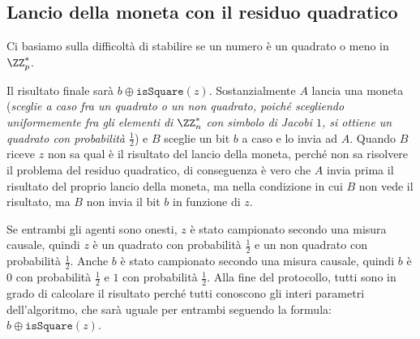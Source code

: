 \subsection{Lancio della moneta con il residuo quadratico}
Ci basiamo sulla difficoltà di stabilire se un numero è un quadrato o meno in $\ZZ_p^*$.

Il risultato finale sarà $b \oplus \texttt{isSquare}(z)$. Sostanzialmente 
$A$ lancia una moneta (\textit{sceglie a caso fra un quadrato o un non quadrato, poiché 
scegliendo uniformemente fra gli elementi di $\ZZ_n^*$ con simbolo 
di Jacobi $1$, si ottiene un quadrato con probabilità $\frac{1}{2}$}) e
$B$ sceglie un bit $b$ a caso e lo invia ad $A$. Quando $B$ riceve $z$ non 
sa qual è il risultato del lancio della moneta, perché non sa risolvere il 
problema del residuo quadratico, di conseguenza è vero che $A$ invia prima 
il risultato del proprio lancio della moneta, ma nella condizione in cui $B$ non 
vede il risultato, ma $B$ non invia il bit $b$ in funzione di $z$.

Se entrambi gli agenti sono onesti, $z$ è stato campionato secondo 
una misura causale, quindi $z$ è un quadrato con probabilità $\frac{1}{2}$ 
e un non quadrato con probabilità $\frac{1}{2}$. Anche $b$ è stato
campionato secondo una misura causale, quindi $b$ è $0$ con probabilità
$\frac{1}{2}$ e $1$ con probabilità $\frac{1}{2}$. Alla fine del protocollo,
tutti sono in grado di calcolare il risultato perché tutti conoscono 
gli interi parametri dell'algoritmo, che sarà uguale per entrambi seguendo la
formula: $b \oplus \texttt{isSquare}(z)$.

